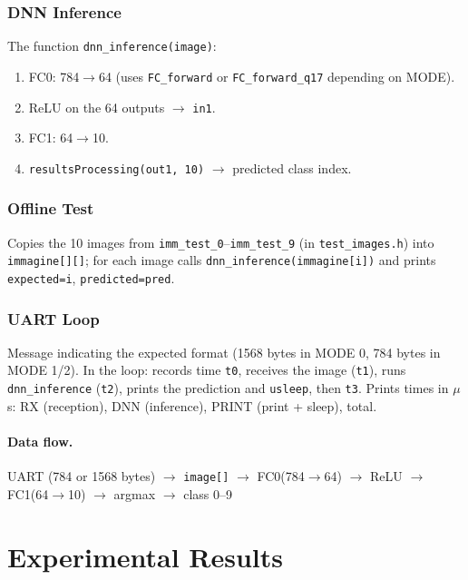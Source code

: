 \documentclass[11pt,a4paper]{article}
\begin{document}
\subsubsection{DNN Inference}
The function \texttt{dnn\_inference(image)}:
\begin{enumerate}
    \item FC0: 784$\rightarrow$64 (uses \texttt{FC\_forward} or \texttt{FC\_forward\_q17} depending on MODE).
    \item ReLU on the 64 outputs $\rightarrow$ \texttt{in1}.
    \item FC1: 64$\rightarrow$10.
    \item \texttt{resultsProcessing(out1, 10)} $\rightarrow$ predicted class index.
\end{enumerate}

\subsubsection{Offline Test}
Copies the 10 images from \texttt{imm\_test\_0}--\texttt{imm\_test\_9} (in \texttt{test\_images.h}) into \texttt{immagine[][]}; for each image calls \texttt{dnn\_inference(immagine[i])} and prints \texttt{expected=i}, \texttt{predicted=pred}.

\subsubsection{UART Loop}
Message indicating the expected format (1568 bytes in MODE 0, 784 bytes in MODE 1/2). In the loop: records time \texttt{t0}, receives the image (\texttt{t1}), runs \texttt{dnn\_inference} (\texttt{t2}), prints the prediction and \texttt{usleep}, then \texttt{t3}. Prints times in $\mu$s: RX (reception), DNN (inference), PRINT (print + sleep), total.

\paragraph{Data flow.}
\begin{center}
UART (784 or 1568 bytes) $\rightarrow$ \texttt{image[]} $\rightarrow$ FC0(784$\rightarrow$64) $\rightarrow$ ReLU $\rightarrow$ FC1(64$\rightarrow$10) $\rightarrow$ argmax $\rightarrow$ class 0--9
\end{center}

\section{Experimental Results}
\end{document}
